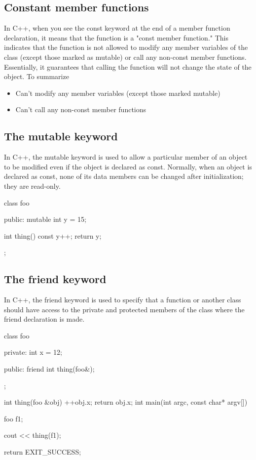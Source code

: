 \documentclass{report}
\begin{document}
    \subsection{Constant member functions} 
    \bigbreak \noindent 
    In C++, when you see the const keyword at the end of a member function declaration, it means that the function is a "const member function." This indicates that the function is not allowed to modify any member variables of the class (except those marked as mutable) or call any non-const member functions. Essentially, it guarantees that calling the function will not change the state of the object. To summarize
    \begin{itemize}
        \item Can't modify any member variables (except those marked mutable)
        \item Can't call any non-const member functions
    \end{itemize}


    \bigbreak \noindent 
    \subsection{The mutable keyword}
    \bigbreak \noindent 
    In C++, the mutable keyword is used to allow a particular member of an object to be modified even if the object is declared as const. Normally, when an object is declared as const, none of its data members can be changed after initialization; they are read-only.
    \bigbreak \noindent 
    
    \begin{cppcode}
class foo {
public: 
    mutable int y = 15;
    
    int thing() const {
        y++;
        return y;
    }
};
    \end{cppcode}
    

    \pagebreak \bigbreak \noindent 
    \subsection{The friend keyword}
    \bigbreak \noindent 
    In C++, the friend keyword is used to specify that a function or another class should have access to the private and protected members of the class where the friend declaration is made.
    \bigbreak \noindent 
    
    \begin{cppcode}
class foo {
private: 
    int x = 12;

public:
    friend int thing(foo&);
};

int thing(foo &obj) {
    ++obj.x;
    return obj.x;
}
int main(int argc, const char* argv[]) {

    foo f1;

    cout << thing(f1);
    
    return EXIT_SUCCESS;
}
    \end{cppcode}
    
\end{document}
